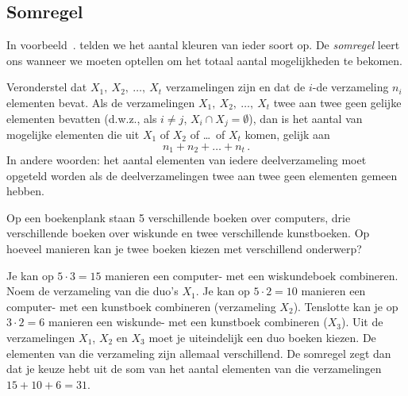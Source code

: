 \subsection{Somregel}
In voorbeeld~\thesection. telden we het aantal kleuren van ieder soort op. De \emph{somregel} leert ons wanneer we moeten optellen om het totaal aantal mogelijkheden te bekomen.

Veronderstel dat $X_1,~X_2,~\dots,~X_t$ verzamelingen zijn en dat de $i$-de verzameling $n_i$ elementen bevat. Als de verzamelingen $X_1,~X_2,~\dots,~X_t$  twee aan twee geen gelijke elementen bevatten (d.w.z., als $i\neq j$, $X_i\cap X_j=\emptyset$), dan is het aantal van mogelijke elementen die uit $X_1$ of $X_2$ of \dots\ of $X_t$ komen, gelijk aan \[n_1+n_2+\dots+n_t\,.\]
In andere woorden: het aantal elementen van iedere deelverzameling moet opgeteld worden als de deelverzamelingen twee aan twee geen elementen gemeen hebben.

\voorbeeld
Op een boekenplank staan 5 verschillende boeken over computers, drie verschillende boeken over wiskunde en twee verschillende kunstboeken. Op hoeveel manieren kan je twee boeken kiezen met verschillend onderwerp?

Je kan op $5\cdot 3=15$ manieren een computer- met een wiskundeboek combineren. Noem de verzameling van die duo's $X_1$. Je kan op $5\cdot2=10$ manieren een computer- met een kunstboek combineren (verzameling $X_2$). Tenslotte kan je op $3\cdot 2=6$ manieren een wiskunde- met een kunstboek combineren ($X_3$). Uit de verzamelingen $X_1$, $X_2$ en $X_3$ moet je uiteindelijk een duo boeken kiezen. De elementen van die verzameling zijn allemaal verschillend. De somregel zegt dan dat je keuze hebt uit de som van het aantal elementen van die verzamelingen $15+10+6=31$.

